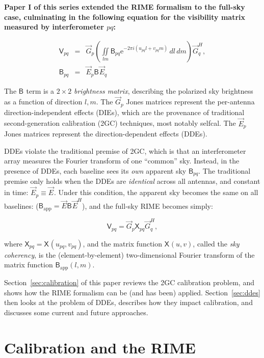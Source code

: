 \documentclass[referee]{aa}
\newcommand{\herm}{H}
\newcommand{\jones}[2]{\vec {#1}_{#2}}
\newcommand{\jonesT}[2]{\vec {#1}^{\herm}_{#2}}
\newcommand{\coh}[2]{\mathsf{{#1}}_{{#2}}}
\newcommand{\EDIT}[1]{{\bf #1}}
\begin{document}
\EDIT{
Paper I of this series extended the RIME formalism \citep{ME1,ME4} to the full-sky case, culminating in the following equation for the visibility matrix measured by interferometer $pq$:
 
\begin{eqnarray}\label{eq:me-allsky}
\coh{V}{pq} & = & \jones{G}{p} \left( \iint\limits_{lm} \coh{B}{pq} \mathrm{e} ^{-2\pi i(u_{pq} l+v_{pq} m)} \,dl\,dm \right) \jonesT{G}{q}, \\
\nonumber \coh{B}{pq} & = & \jones{E}{p} \coh{B}{} \jones{E}{q}
\end{eqnarray}

The $\coh{B}{}$ term is a $2\times2$ {\em brightness matrix}, describing the polarized sky brightness as a function of direction $l,m$. The $\jones{G}{p}$ Jones matrices represent the per-antenna direction-independent effects (DIEs), which are the provenance of traditional second-generation calibration (2GC) techniques, most notably selfcal. The $\jones{E}{p}$ Jones matrices represent the direction-dependent effects (DDEs). 

DDEs violate the traditional premise of 2GC, which is that an interferometer array measures the Fourier transform of one ``common'' sky. Instead, in the presence of DDEs, each baseline sees its \emph{own} apparent sky $\coh{B}{pq}$. The traditional premise only holds when the DDEs are \emph{identical} across all antennas, and constant in time: $\jones{E}{p} \equiv \jones{E}{}$. Under this condition, the apparent sky becomes the same on all baselines: ($\coh{B}{\mathrm{app}} =  \jones{E}{} \coh{B}{} \jonesT{E}{}$), and the full-sky RIME becomes simply: 

\begin{equation}\label{eq:me-allsky-simple}
\coh{V}{pq} = \jones{G}{p} \coh{X}{pq} \jonesT{G}{q},
\end{equation}

where $\coh{X}{pq} = \coh{X}{}(u_{pq},v_{pq})$, and the matrix function $\coh{X}{}(u,v)$, called the {\em sky coherency}, is the (element-by-element) two-dimensional Fourier transform of the matrix function $\coh{B}{\mathrm{app}}(l,m)$.

Section~\ref{sec:calibration} of this paper reviews the 2GC calibration problem, and shows how the RIME formalism can be (and has been) applied. Section~\ref{sec:ddes} then looks at the problem of DDEs, describes how they impact calibration, and discusses some current and future approaches.
}

\section{\label{sec:calibration}Calibration and the RIME}
\end{document}
